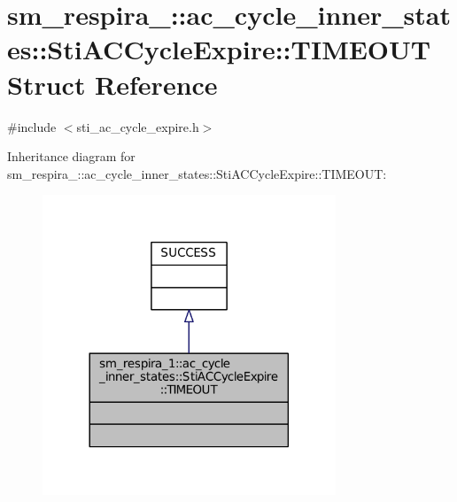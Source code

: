 \hypertarget{structsm__respira__1_1_1ac__cycle__inner__states_1_1StiACCycleExpire_1_1TIMEOUT}{}\section{sm\+\_\+respira\+\_\+:\+:ac\+\_\+cycle\+\_\+inner\+\_\+states\+:\+:Sti\+A\+C\+Cycle\+Expire\+:\+:T\+I\+M\+E\+O\+UT Struct Reference}
\label{structsm__respira__1_1_1ac__cycle__inner__states_1_1StiACCycleExpire_1_1TIMEOUT}


{\ttfamily \#include $<$sti\+\_\+ac\+\_\+cycle\+\_\+expire.\+h$>$}



Inheritance diagram for sm\+\_\+respira\+\_\+:\+:ac\+\_\+cycle\+\_\+inner\+\_\+states\+:\+:Sti\+A\+C\+Cycle\+Expire\+:\+:T\+I\+M\+E\+O\+UT\+:
\nopagebreak
\begin{figure}[H]
\begin{center}
\leavevmode
\includegraphics[width=248pt]{structsm__respira__1_1_1ac__cycle__inner__states_1_1StiACCycleExpire_1_1TIMEOUT__inherit__graph}
\end{center}
\end{figure}


